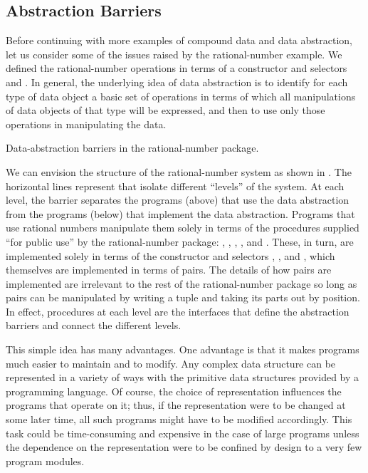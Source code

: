 \subsection{Abstraction Barriers}
\label{Section 2.1.2}

Before continuing with more examples of compound data and data abstraction, let
us consider some of the issues raised by the rational-number example.  We
defined the rational-number operations in terms of a constructor
 and selectors  and .  In general, the
underlying idea of data abstraction is to identify for each type of data object
a basic set of operations in terms of which all manipulations of data objects
of that type will be expressed, and then to use only those operations in
manipulating the data.

\begin{imageFigure}{Data-abstraction barriers in the rational-number package.}
  
\end{imageFigure}

We can envision the structure of the rational-number system as shown in
.  The horizontal lines represent  that isolate different ``levels'' of the system.  At each level, the
barrier separates the programs (above) that use the data abstraction from the
programs (below) that implement the data abstraction.  Programs that use
rational numbers manipulate them solely in terms of the procedures supplied
``for public use'' by the rational-number package: ,
, , , and .
These, in turn, are implemented solely in terms of the constructor and selectors
, , and , which themselves are
implemented in terms of pairs.  The details of how pairs are implemented are
irrelevant to the rest of the rational-number package so long as pairs can be
manipulated by writing a tuple and taking its parts out by position.  In
effect,
procedures at each level are the interfaces that define the abstraction
barriers and connect the different levels.

This simple idea has many advantages.  One advantage is that it makes programs
much easier to maintain and to modify.  Any complex data structure can be
represented in a variety of ways with the primitive data structures provided by
a programming language.  Of course, the choice of representation influences the
programs that operate on it; thus, if the representation were to be changed at
some later time, all such programs might have to be modified accordingly.  This
task could be time-consuming and expensive in the case of large programs unless
the dependence on the representation were to be confined by design to a very
few program modules.

